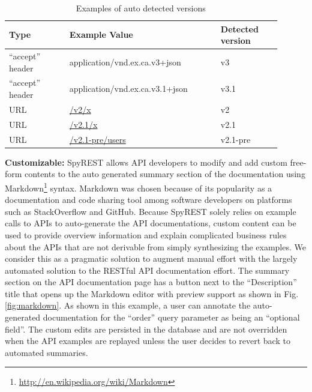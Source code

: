 \documentclass[conference]{IEEEtran}
\begin{document}
\begin{table}[!tbh]
  \begin{tabular}{|p{0.2\linewidth}|p{0.5\linewidth}|p{0.2\linewidth}|}
    \hline
    Type & Example Value & Detected version\\
    \hline
    ``accept'' header & application/vnd.ex.ca.v3+json & v3\\
    \hline
    ``accept'' header & application/vnd.ex.ca.v3.1+json & v3.1\\
    \hline
    URL & \url{/v2/x} & v2\\
    \hline
    URL & \url{/v2.1/x} & v2.1\\
    \hline
    URL & \url{/v2.1-pre/users} & v2.1-pre\\
    \hline
  \end{tabular}
  \caption{Examples of auto detected versions}
  \label{table:versions}
\end{table}

\textbf{Customizable:} SpyREST allows API developers to modify and add custom free-form contents to the auto generated summary section of the documentation using Markdown\footnote{\url{http://en.wikipedia.org/wiki/Markdown}} syntax. Markdown was chosen because of its popularity as a documentation and code sharing tool among software developers on platforms such as StackOverflow and GitHub. Because SpyREST solely relies on example calls to APIs to auto-generate the API documentations, custom content can be used to provide overview information and explain complicated business rules about the APIs that are not derivable from simply synthesizing the examples. We consider this as a pragmatic solution to augment manual effort with the largely automated solution to the RESTful API documentation effort. The summary section on the API documentation page has a button next to the ``Description'' title that opens up the Markdown editor with preview support as shown in Fig. \ref{fig:markdown}. As shown in this example, a user can annotate the auto-generated documentation for the ``order'' query parameter as being an ``optional field''. The custom edits are persisted in the database and are not overridden when the API examples are replayed unless the user decides to revert back to automated summaries.
\end{document}

